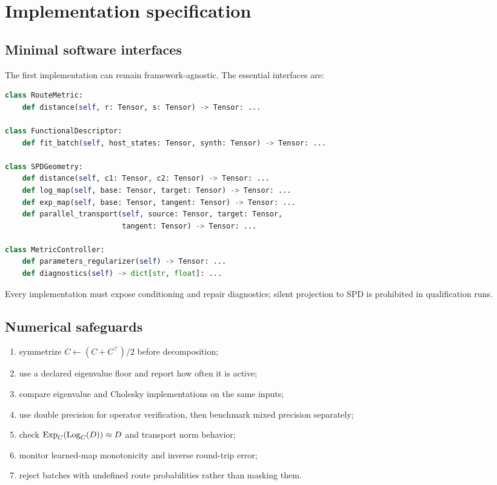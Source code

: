 \section{Implementation specification}

\subsection{Minimal software interfaces}
The first implementation can remain framework-agnostic. The essential interfaces are:
\begin{lstlisting}[language=Python,basicstyle=\ttfamily\small,frame=single,breaklines=true]
class RouteMetric:
    def distance(self, r: Tensor, s: Tensor) -> Tensor: ...

class FunctionalDescriptor:
    def fit_batch(self, host_states: Tensor, synth: Tensor) -> Tensor: ...

class SPDGeometry:
    def distance(self, c1: Tensor, c2: Tensor) -> Tensor: ...
    def log_map(self, base: Tensor, target: Tensor) -> Tensor: ...
    def exp_map(self, base: Tensor, tangent: Tensor) -> Tensor: ...
    def parallel_transport(self, source: Tensor, target: Tensor,
                           tangent: Tensor) -> Tensor: ...

class MetricController:
    def parameters_regularizer(self) -> Tensor: ...
    def diagnostics(self) -> dict[str, float]: ...
\end{lstlisting}
Every implementation must expose conditioning and repair diagnostics; silent projection to SPD is prohibited in qualification runs.

\subsection{Numerical safeguards}
\begin{enumerate}[leftmargin=1.7em]
  \item symmetrize $C\leftarrow(C+C^\top)/2$ before decomposition;
  \item use a declared eigenvalue floor and report how often it is active;
  \item compare eigenvalue and Cholesky implementations on the same inputs;
  \item use double precision for operator verification, then benchmark mixed precision separately;
  \item check $\operatorname{Exp}_C(\operatorname{Log}_C(D))\approx D$ and transport norm behavior;
  \item monitor learned-map monotonicity and inverse round-trip error;
  \item reject batches with undefined route probabilities rather than masking them.
\end{enumerate}


